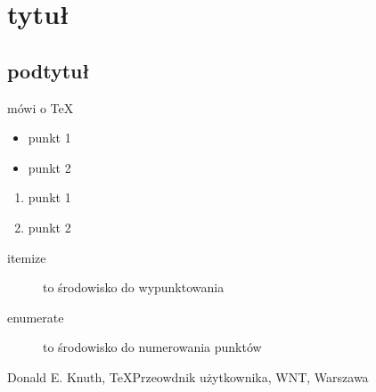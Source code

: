 \documentclass{article}
\begin{document}
\tableofcontents
\section{tytuł}
\subsection{podtytuł}
\cite{dote:ks} mówi o \TeX

\begin{itemize}
\item punkt 1
\item punkt 2

\end{itemize}

\begin {enumerate}
\item punkt 1
\item punkt 2

\end {enumerate}

\begin {description}

\item [itemize] to środowisko do wypunktowania
\item [enumerate] to środowisko do numerowania punktów

\end{description}

\begin{thebibliography}{1}

 Donald E. Knuth, \TeX Przeowdnik użytkownika, WNT, Warszawa

\end{thebibliography}
\end{document}
